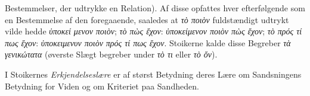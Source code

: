 \documentclass[12pt,a4paper]{book}
\newcommand{\gk}[1]{\textit{#1}}
\begin{document}
Bestemmelser, der udtrykke en Relation). Af disse opfattes
hver efterfølgende som en Bestemmelse af den foregaaende,
saaledes at \gk{τὸ ποιὸν} fuldstændigt udtrykt vilde hedde \gk{ὑποκεί\-%
μενον ποιὸν}; \gk{τὸ πὼς ἔχον}: \gk{ὑποκείμενον ποιὸν πὼς ἔχον}; \gk{τὸ
πρός τί πως ἔχον}: \gk{ὑποκειμενυν ποιὸν πρός τί πως ἔχον}.
Stoikerne kalde disse Begreber \gk{τὰ γενικώτατα} (øverste Slægt\-%
begreber under \gk{τὸ τι} eller \gk{τὸ ὄν}).

I Stoikernes \emph{Erkjendelseslære} er af størst Betydning
deres Lære om Sandsningens Betydning for Viden og om
Kriteriet paa Sandheden.
\end{document}
